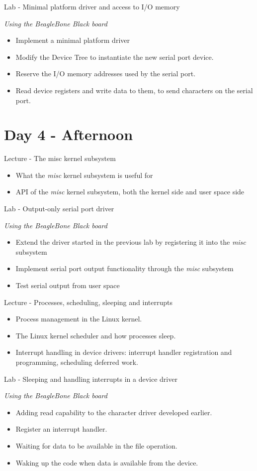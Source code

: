 \documentclass[a4paper,12pt,obeyspaces,spaces,hyphens]{article}
\begin{document}
\feagendaonecolumn
{Lab - Minimal platform driver and access to I/O memory}
{
  {\em Using the BeagleBone Black board}
  \begin{itemize}
  \item Implement a minimal platform driver
  \item Modify the Device Tree to instantiate the new serial port
    device.
  \item Reserve the I/O memory addresses used by the serial port.
  \item Read device registers and write data to them, to send
    characters on the serial port.
  \end{itemize}
}

\section{Day 4 - Afternoon}

\feagendatwocolumn
{Lecture - The misc kernel subsystem}
{
  \begin{itemize}
  \item What the {\em misc} kernel subsystem is useful for
  \item API of the {\em misc} kernel subsystem, both the kernel side
    and user space side
  \end{itemize}
}
{Lab - Output-only serial port driver}
{
  {\em Using the BeagleBone Black board}
  \begin{itemize}
  \item Extend the driver started in the previous lab by registering
    it into the {\em misc} subsystem
  \item Implement serial port output functionality through the {\em
      misc} subsystem
  \item Test serial output from user space
  \end{itemize}
}

\feagendatwocolumn
{Lecture - Processes, scheduling, sleeping and interrupts}
{
  \begin{itemize}
  \item Process management in the Linux kernel.
  \item The Linux kernel scheduler and how processes sleep.
  \item Interrupt handling in device drivers: interrupt handler
    registration and programming, scheduling deferred work.
  \end{itemize}
}
{Lab - Sleeping and handling interrupts in a device driver}
{
  {\em Using the BeagleBone Black board}
  \begin{itemize}
  \item Adding read capability to the character driver developed
    earlier.
  \item Register an interrupt handler.
  \item Waiting for data to be available in the  file operation.
  \item Waking up the code when data is available from the device.
  \end{itemize}
}
\end{document}
